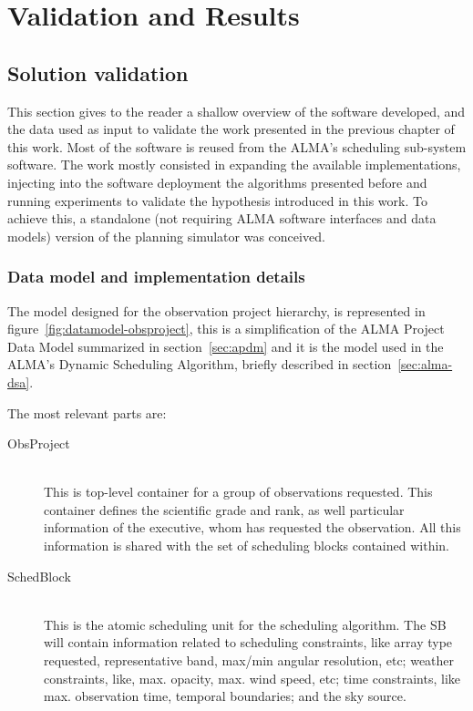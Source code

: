 \chapter{Validation and Results}

\section{Solution validation}

This section gives to the reader a shallow overview of the software developed, and the data used as input to validate the work presented in the previous chapter of this work. Most of the software is reused from the ALMA's scheduling sub-system software. The work mostly consisted in expanding the available implementations, injecting into the software deployment the algorithms presented before and running experiments to validate the hypothesis introduced in this work. To achieve this, a standalone (not requiring ALMA software interfaces and data models) version of the planning simulator was conceived. 

\subsection {Data model and implementation details}

The model designed for the observation project hierarchy, is represented in figure~\ref{fig:datamodel-obsproject}, this is a simplification of the ALMA Project Data Model summarized in section~\ref{sec:apdm} and it is the model used in the ALMA's Dynamic Scheduling Algorithm, briefly described in section~\ref{sec:alma-dsa}.

The most relevant parts are: 
\begin{description}
\item[ObsProject] \hfill \\
This is top-level container for a group of observations requested. This container defines the scientific grade and rank, as well particular information of the executive, whom has requested the observation. All this information is shared with the set of scheduling blocks contained within.
\item[SchedBlock] \hfill \\
This is the atomic scheduling unit for the scheduling algorithm. The SB will contain information related to scheduling constraints, like array type requested, representative band, max/min angular resolution, etc; weather constraints, like, max. opacity, max. wind speed, etc; time constraints, like max. observation time, temporal boundaries; and the sky source.
\end{description}

